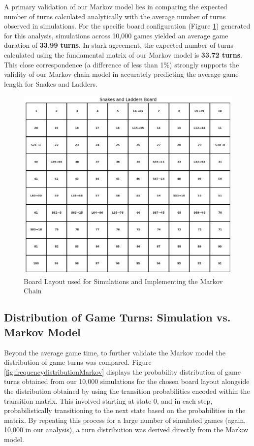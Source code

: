 A primary validation of our Markov model lies in comparing the expected number of turns calculated analytically with the average number of turns observed in simulations. For the specific board configuration (Figure \ref{fig:boardlayout}) generated for this analysis, simulations across 10,000 games yielded an average game duration of \textbf{33.99 turns}.  In stark agreement, the expected number of turns calculated using the fundamental matrix of our Markov model is \textbf{33.72 turns}. This close correspondence (a difference of less than 1\%) strongly supports the validity of our Markov chain model in accurately predicting the average game length for Snakes and Ladders. 

\begin{figure}
	\centering
	\includegraphics[width=0.7\linewidth]{"../Markov Modelling/Data/BoardLayout"}
	\caption{Board Layout used for Simulations and Implementing the Markov Chain}
	\label{fig:boardlayout}
\end{figure}

\subsection{Distribution of Game Turns: Simulation vs. Markov Model}

Beyond the average game time, to further validate the Markov model the distribution of game turns was compared. Figure \ref{fig:frequencydistributionMarkov} displays the probability distribution of game turns obtained from our 10,000 simulations for the chosen board layout alongside the distribution obtained by using the transition probabilities encoded within the transition matrix. This involved starting at state 0, and in each step, probabilistically transitioning to the next state based on the probabilities in the matrix. By repeating this process for a large number of simulated games (again, 10,000 in our analysis), a turn distribution was derived directly from the Markov model.

